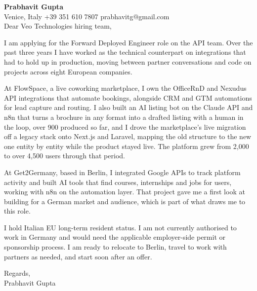\documentclass[a4paper,10.5pt]{article}
\begin{document}
\textbf{Prabhavit Gupta}\\
Venice, Italy \textbar{} +39 351 610 7807 \textbar{} prabhavitg@gmail.com\\[10pt]
Dear Veo Technologies hiring team,

I am applying for the Forward Deployed Engineer role on the API team. Over the past three years I have worked as the technical counterpart on integrations that had to hold up in production, moving between partner conversations and code on projects across eight European companies.

At FlowSpace, a live coworking marketplace, I own the OfficeRnD and Nexudus API integrations that automate bookings, alongside CRM and GTM automations for lead capture and routing. I also built an AI listing bot on the Claude API and n8n that turns a brochure in any format into a drafted listing with a human in the loop, over 900 produced so far, and I drove the marketplace's live migration off a legacy stack onto Next.js and Laravel, mapping the old structure to the new one entity by entity while the product stayed live. The platform grew from 2,000 to over 4,500 users through that period.

At Get2Germany, based in Berlin, I integrated Google APIs to track platform activity and built AI tools that find courses, internships and jobs for users, working with n8n on the automation layer. That project gave me a first look at building for a German market and audience, which is part of what draws me to this role.

I hold Italian EU long-term resident status. I am not currently authorised to work in Germany and would need the applicable employer-side permit or sponsorship process. I am ready to relocate to Berlin, travel to work with partners as needed, and start soon after an offer.

Regards,\\
Prabhavit Gupta
\end{document}

